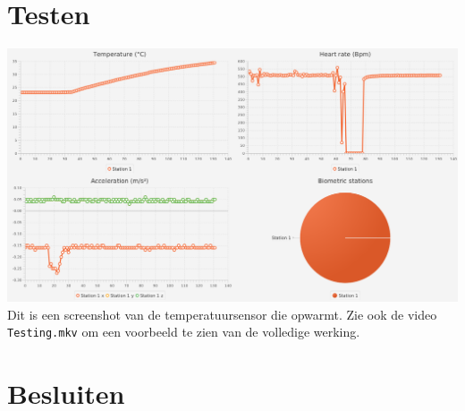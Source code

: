 \documentclass[a4paper]{report}
\newcommand{\code}[1]{\colorbox{light-gray}{\texttt{#1}}}
\begin{document}
\chapter{Testen}
    \includegraphics[width=\textwidth]{gui}\\
    Dit is een screenshot van de temperatuursensor die opwarmt.
    Zie ook de video \code{Testing.mkv} om een voorbeeld te zien van de volledige werking.

\chapter{Besluiten}
\end{document}
